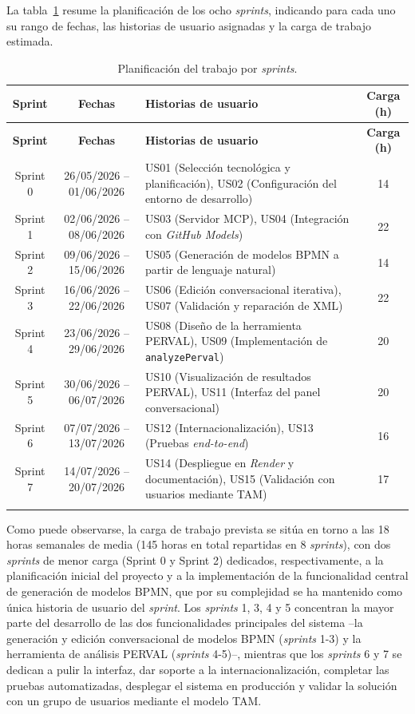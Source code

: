 {La tabla~\ref{tab:planTrabajo} resume la planificación de los ocho \textit{sprints}, indicando para cada uno su rango de fechas, las historias de usuario asignadas y la carga de trabajo estimada.

\begingroup
\small
\begin{longtable}{|c|c|p{6cm}|c|}
\hline
\rowcolor{gray!20} \textbf{Sprint} & \textbf{Fechas} & \textbf{Historias de usuario} & \textbf{Carga (h)} \\
\hline
\endfirsthead
\hline
\rowcolor{gray!20} \textbf{Sprint} & \textbf{Fechas} & \textbf{Historias de usuario} & \textbf{Carga (h)} \\
\hline
\endhead
Sprint 0 & 26/05/2026 -- 01/06/2026 & US01 (Selección tecnológica y planificación), US02 (Configuración del entorno de desarrollo) & 14 \\
\hline
Sprint 1 & 02/06/2026 -- 08/06/2026 & US03 (Servidor MCP), US04 (Integración con \textit{GitHub Models}) & 22 \\
\hline
Sprint 2 & 09/06/2026 -- 15/06/2026 & US05 (Generación de modelos BPMN a partir de lenguaje natural) & 14 \\
\hline
Sprint 3 & 16/06/2026 -- 22/06/2026 & US06 (Edición conversacional iterativa), US07 (Validación y reparación de XML) & 22 \\
\hline
Sprint 4 & 23/06/2026 -- 29/06/2026 & US08 (Diseño de la herramienta PERVAL), US09 (Implementación de \texttt{analyzePerval}) & 20 \\
\hline
Sprint 5 & 30/06/2026 -- 06/07/2026 & US10 (Visualización de resultados PERVAL), US11 (Interfaz del panel conversacional) & 20 \\
\hline
Sprint 6 & 07/07/2026 -- 13/07/2026 & US12 (Internacionalización), US13 (Pruebas \textit{end-to-end}) & 16 \\
\hline
Sprint 7 & 14/07/2026 -- 20/07/2026 & US14 (Despliegue en \textit{Render} y documentación), US15 (Validación con usuarios mediante TAM) & 17 \\
\hline
\caption{Planificación del trabajo por \textit{sprints}.}
\label{tab:planTrabajo}
\end{longtable}
\endgroup

Como puede observarse, la carga de trabajo prevista se sitúa en torno a las 18 horas semanales de media (145 horas en total repartidas en 8 \textit{sprints}), con dos \textit{sprints} de menor carga (Sprint 0 y Sprint 2) dedicados, respectivamente, a la planificación inicial del proyecto y a la implementación de la funcionalidad central de generación de modelos BPMN, que por su complejidad se ha mantenido como única historia de usuario del \textit{sprint}. Los \textit{sprints} 1, 3, 4 y 5 concentran la mayor parte del desarrollo de las dos funcionalidades principales del sistema --la generación y edición conversacional de modelos BPMN (\textit{sprints} 1-3) y la herramienta de análisis PERVAL (\textit{sprints} 4-5)--, mientras que los \textit{sprints} 6 y 7 se dedican a pulir la interfaz, dar soporte a la internacionalización, completar las pruebas automatizadas, desplegar el sistema en producción y validar la solución con un grupo de usuarios mediante el modelo TAM.

\shorthandon{<>}

